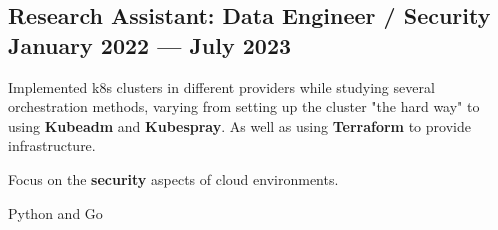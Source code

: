 \documentclass[letter,10pt]{article}
\begin{document}



\subsection{{Research Assistant: Data Engineer / Security \hfill January 2022 --- July 2023}}

\begin{zitemize}
\item Implemented k8s clusters in different providers while studying several orchestration methods, varying from setting up the cluster "the hard way" to using \textbf{Kubeadm} and \textbf{Kubespray}. As well as using \textbf{Terraform} to provide infrastructure. 
\item Focus on the \textbf{security} aspects of cloud environments.
\item Python and Go


\end{zitemize}

\end{document}
